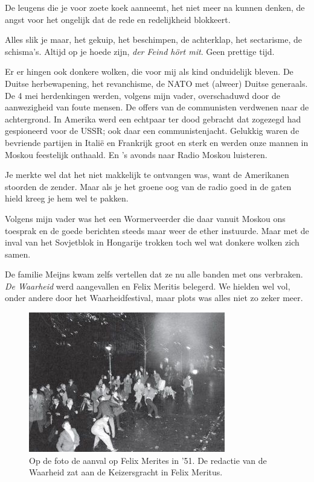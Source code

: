 \documentclass[12pt,twoside]{memoir}
\begin{document}
De leugens die je voor zoete koek aanneemt, het niet meer na kunnen denken, de angst voor het ongelijk dat de rede en redelijkheid blokkeert. 

Alles slik je maar, het gekuip, het beschimpen, de achterklap, het sectarisme, de schisma's. Altijd op je hoede zijn, \emph{der Feind hört mit}. Geen prettige tijd. 

Er er hingen ook donkere wolken, die voor mij als kind onduidelijk bleven. De Duitse herbewapening, het revanchisme, de NATO met (alweer) Duitse generaals. De 4 mei herdenkingen werden, volgens mijn vader, overschaduwd door de aanwezigheid van foute mensen. De offers van de communisten verdwenen naar de achtergrond. In Amerika werd een echtpaar ter dood gebracht dat zogezegd had gespioneerd voor de USSR; ook daar een communistenjacht. Gelukkig waren de bevriende partijen in Italië en Frankrijk groot en sterk en werden onze mannen in Moskou feestelijk onthaald. En ’s avonds naar Radio Moskou luisteren. 

Je merkte wel dat het niet makkelijk te ontvangen was, want de Amerikanen stoorden de zender. Maar als je het groene oog van de radio goed in de gaten hield kreeg je hem wel te pakken. 

Volgens mijn vader was het een Wormerveerder die daar vanuit Moskou ons toesprak en de goede berichten steeds maar weer de ether instuurde. Maar met de inval van het Sovjetblok in Hongarije trokken toch wel wat donkere wolken zich samen. 

De familie Meijns kwam zelfs vertellen dat ze nu alle banden met ons verbraken. \emph{De Waarheid} werd aangevallen en Felix Meritis belegerd. We hielden wel vol, onder andere door het Waarheidfestival, maar plots was alles niet zo zeker meer.

\begin{figure}
\includegraphics[width=\textwidth]{img/ch17/Felix_Meritis1}
\caption*{\footnotesize Op de foto de aanval op Felix Merites in ’51. De redactie van de Waarheid zat aan de Keizersgracht in Felix Meritus.}
\end{figure}
\end{document}
